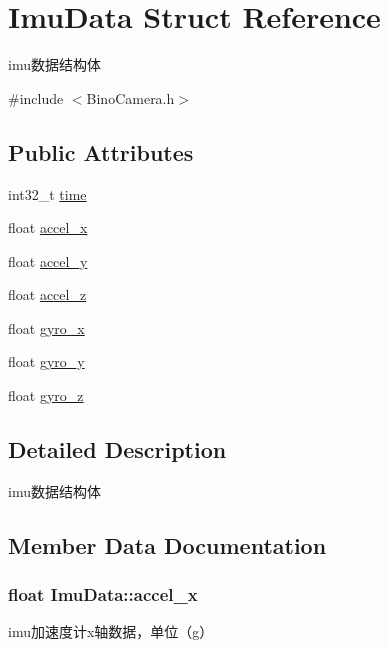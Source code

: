 \hypertarget{structImuData}{}\section{Imu\+Data Struct Reference}
\label{structImuData}


imu数据结构体  




{\ttfamily \#include $<$Bino\+Camera.\+h$>$}

\subsection*{Public Attributes}
\begin{DoxyCompactItemize}
\item 
int32\+\_\+t \hyperlink{structImuData_a53ab25c90322decc7a9976428bca2f5f}{time}
\item 
float \hyperlink{structImuData_ab0a1374aff9f7988812811f6e453c123}{accel\+\_\+x}
\item 
float \hyperlink{structImuData_abfc7185440169b8ef2571f9df60741b5}{accel\+\_\+y}
\item 
float \hyperlink{structImuData_a0c86f254f9f528e174e9ea7779eb2e99}{accel\+\_\+z}
\item 
float \hyperlink{structImuData_a7693a5307463d99e37530abc5f3ec8ec}{gyro\+\_\+x}
\item 
float \hyperlink{structImuData_a9cb9ff8ceb19f95af9a2c1144d167067}{gyro\+\_\+y}
\item 
float \hyperlink{structImuData_a1f5297d4e01240a47f0c4a8338a9df5f}{gyro\+\_\+z}
\end{DoxyCompactItemize}


\subsection{Detailed Description}
imu数据结构体 

\subsection{Member Data Documentation}
\subsubsection[{\texorpdfstring{accel\+\_\+x}{accel_x}}]{\setlength{\rightskip}{0pt plus 5cm}float Imu\+Data\+::accel\+\_\+x}\hypertarget{structImuData_ab0a1374aff9f7988812811f6e453c123}{}\label{structImuData_ab0a1374aff9f7988812811f6e453c123}
imu加速度计x轴数据，单位（g） 

